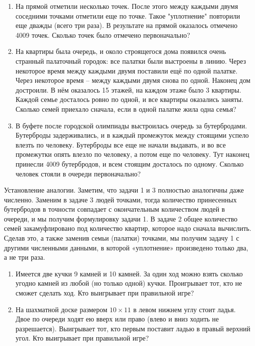 \begin{enumerate}
	\item  На прямой отметили несколько точек. После этого между каждыми двумя соседними точками отметили еще по точке. Такое "уплотнение" повторили еще дважды (всего три раза). В результате на прямой оказалось отмечено 4009 точек. Сколько точек было отмечено первоначально?
	
	\item  На квартиры была очередь, и около строящегося дома появился очень странный палаточный городок: все палатки были выстроены в линию. Через некоторое время между каждыми двумя поставили ещё по одной палатке. Через некоторое время -- между каждыми двумя снова по одной. Наконец дом достроили. В нём оказалось 15 этажей, на каждом этаже было 3 квартиры. Каждой семье досталось ровно по одной, и все квартиры оказались заняты. Сколько семей приехало сначала, если в одной палатке жила одна семья?
	
	\item В буфете после городской олимпиады выстроилась очередь за бутербродами. Бутерброды задерживались, и в каждый промежуток между стоящими успело влезть по человеку. Бутерброды все еще не начали выдавать, и во все промежутки опять влезло по человеку, а потом еще по человеку. Тут наконец принесли 4009 бутербродов, и всем стоящим досталось по одному. Сколько человек стояли в очереди первоначально?
\end{enumerate}

Установление аналогии. Заметим, что задачи 1 и 3 полностью аналогичны даже численно. Заменим в задаче 3 людей точками, тогда количество принесенных бутербродов в точности совпадает с окончательным количеством людей в очереди, и мы получим формулировку задачи 1. В задаче 2 общее количество семей закамуфлировано под количество квартир, которое надо сначала вычислить. Сделав это, а также заменив семьи (палатки) точками, мы получим задачу 1 с другими численными данными, в которой «уплотнение» произведено только два, а не три раза.

\begin{enumerate}
	\item  Имеется две кучки 9 камней и 10 камней. За один ход можно взять сколько угодно камней из любой (но только одной) кучки. Проигрывает тот, кто не сможет сделать ход. Кто выигрывает при правильной игре?
	
	\item На шахматной доске размером $ 10\times11 $ в левом нижнем углу стоит ладья. Двое по очереди ходят ею вверх или право (влево и вниз ходить не разрешается). Выигрывает тот, кто первым поставит ладью в правый верхний угол. Кто выигрывает при правильной игре?
\end{enumerate}

